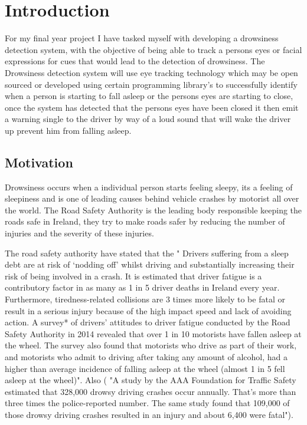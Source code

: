 \chapter{Introduction}
\label{chap:intro}
\textbf{}

For my final year project I have tasked myself with developing a drowsiness detection system, with the objective of being able to track a persons eyes or facial expressions for cues that would lead to the detection of drowsiness. The Drowsiness detection system will use eye tracking technology which may be open sourced or developed using certain programming  library's to successfully identify when a person is starting to fall asleep or the persons eyes are starting to close, once the system has detected that the persons eyes have been closed it then emit a warning single to the driver by way of a loud sound that will wake the driver up prevent him from falling asleep.  


\section{Motivation}
Drowsiness occurs when a individual person starts feeling sleepy, its a feeling of sleepiness and is one of leading causes behind vehicle crashes by motorist all over the world. The Road Safety Authority is the leading body responsible keeping the roads safe in Ireland, they try to make roads safer by reducing the number of injuries and the severity of these injuries. 

The road safety authority have stated that the " Drivers suffering from a sleep debt are at risk of ‘nodding off’ whilst driving and substantially increasing their risk of being involved in a crash. It is estimated that driver fatigue is a contributory factor in as many as 1 in 5 driver deaths in Ireland every year. Furthermore, tiredness-related collisions are 3 times more likely to be fatal or result in a serious injury because of the high impact speed and lack of avoiding action. A survey* of drivers’ attitudes to driver fatigue conducted by the Road Safety Authority in 2014 revealed that over 1 in 10 motorists have fallen asleep at the wheel.  The survey also found that motorists who drive as part of their work, and motorists who admit to driving after taking any amount of alcohol, had a higher than average incidence of falling asleep at the wheel (almost 1 in 5 fell asleep at the wheel)". 
Also ( "A study by the AAA Foundation for Traffic Safety estimated that 328,000 drowsy driving crashes occur annually. That's more than three times the police-reported number. The same study found that 109,000 of those drowsy driving crashes resulted in an injury and about 6,400 were fatal"). 

